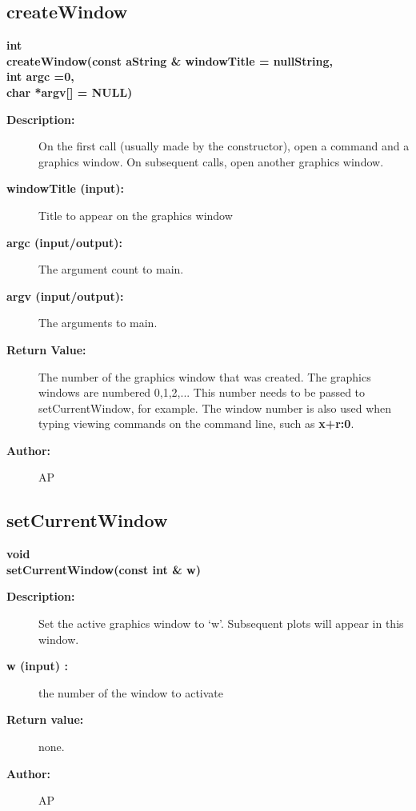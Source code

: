 \subsection{createWindow}
 
\newlength{\GLGraphicsInterfaceIncludeArgIndent}
\begin{flushleft} \textbf{%
int  \\ 
\settowidth{\GLGraphicsInterfaceIncludeArgIndent}{createWindow(}%
createWindow(const aString \& windowTitle  = nullString,\\ 
\hspace{\GLGraphicsInterfaceIncludeArgIndent}int argc  =0, \\ 
\hspace{\GLGraphicsInterfaceIncludeArgIndent}char *argv[]  = NULL) 
}\end{flushleft}
\begin{description}
\item[{\bf Description:}] 
   On the first call (usually made by the constructor), open a command and a graphics window.
   On subsequent calls, open another graphics window.
\item[{\bf windowTitle (input):}]  Title to appear on the graphics window
\item[{\bf argc (input/output):}]  The argument count to main.
\item[{\bf argv (input/output):}]  The arguments to main.

\item[{\bf Return Value:}]  The number of the graphics window that was created. The graphics windows are 
    numbered 0,1,2,... This number needs to be passed to {\ff setCurrentWindow}, for example. The 
    window number is also used when typing viewing commands on the command line, such as {\bf x+r:0}.

\item[{\bf Author:}]  AP
\end{description}
\subsection{setCurrentWindow}
 
\begin{flushleft} \textbf{%
void  \\ 
\settowidth{\GLGraphicsInterfaceIncludeArgIndent}{setCurrentWindow(}%
setCurrentWindow(const int \& w)
}\end{flushleft}
\begin{description}
\item[{\bf Description:}] 
 Set the active graphics window to `w'. Subsequent plots will appear in this window.

\item[{\bf w (input) :}]  the number of the window to activate

\item[{\bf Return value:}]  none.

\item[{\bf Author:}]  AP
\end{description}
